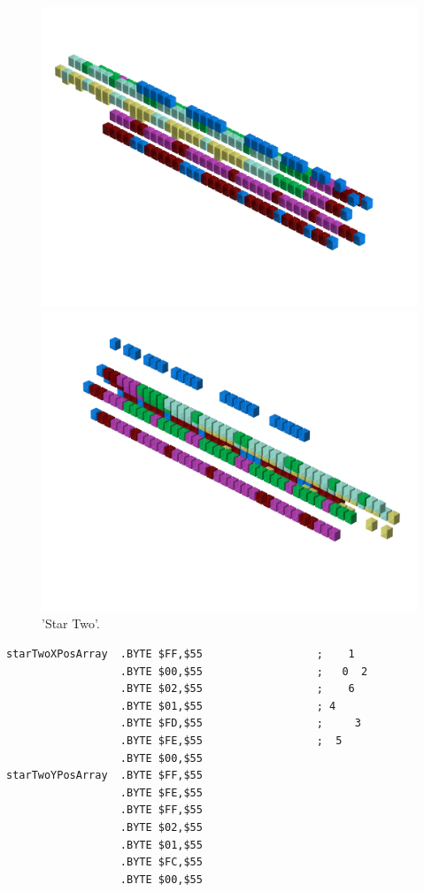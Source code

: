 \begin{figure}[H]
    \centering
    \begin{adjustbox}{width=12cm,center}
      \includegraphics[width=12cm]{src/patterns/pattern3-45.png}%
    \end{adjustbox}
    \begin{adjustbox}{width=12cm,margin=0cm -4cm}
      \includegraphics[width=12cm]{src/patterns/pattern3-225.png}%
    \end{adjustbox}
\caption{'Star Two'.}
\end{figure}
\clearpage

\begin{lstlisting}
starTwoXPosArray  .BYTE $FF,$55                  ;    1  
                  .BYTE $00,$55                  ;   0  2
                  .BYTE $02,$55                  ;    6  
                  .BYTE $01,$55                  ; 4     
                  .BYTE $FD,$55                  ;     3 
                  .BYTE $FE,$55                  ;  5    
                  .BYTE $00,$55
starTwoYPosArray  .BYTE $FF,$55
                  .BYTE $FE,$55
                  .BYTE $FF,$55
                  .BYTE $02,$55
                  .BYTE $01,$55
                  .BYTE $FC,$55
                  .BYTE $00,$55
\end{lstlisting}


